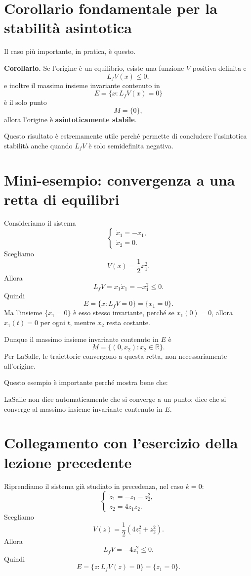 \section{Corollario fondamentale per la stabilità asintotica}

Il caso più importante, in pratica, è questo.

\medskip

\noindent
\textbf{Corollario.}
Se l'origine è un equilibrio, esiste una funzione \(V\) positiva definita e
\[
L_fV(x)\le 0,
\]
e inoltre il massimo insieme invariante contenuto in
\[
E=\{x:L_fV(x)=0\}
\]
è il solo punto
\[
M=\{0\},
\]
allora l'origine è \textbf{asintoticamente stabile}.

\medskip

\noindent
Questo risultato è estremamente utile perché permette di concludere l'asintotica stabilità anche quando \(L_fV\) è solo semidefinita negativa.

\section{Mini-esempio: convergenza a una retta di equilibri}

Consideriamo il sistema
\[
\begin{cases}
\dot x_1 = -x_1,\\[4pt]
\dot x_2 = 0.
\end{cases}
\]
Scegliamo
\[
V(x)=\frac{1}{2}x_1^2.
\]
Allora
\[
L_fV=x_1\dot x_1=-x_1^2\le 0.
\]
Quindi
\[
E=\{x:L_fV=0\}=\{x_1=0\}.
\]
Ma l'insieme \(\{x_1=0\}\) è esso stesso invariante, perché se \(x_1(0)=0\), allora \(x_1(t)=0\) per ogni \(t\), mentre \(x_2\) resta costante.

Dunque il massimo insieme invariante contenuto in \(E\) è
\[
M=\{(0,x_2):x_2\in\mathbb{R}\}.
\]
Per LaSalle, le traiettorie convergono a questa retta, non necessariamente all'origine.

Questo esempio è importante perché mostra bene che:
\begin{center}
LaSalle non dice automaticamente che si converge a un punto; dice che si converge al massimo insieme invariante contenuto in \(E\).
\end{center}

\section{Collegamento con l'esercizio della lezione precedente}

Riprendiamo il sistema già studiato in precedenza, nel caso \(k=0\):
\[
\begin{cases}
\dot z_1 = -z_1-z_2^2,\\[4pt]
\dot z_2 = 4z_1z_2.
\end{cases}
\]
Scegliamo
\[
V(z)=\frac{1}{2}\left(4z_1^2+z_2^2\right).
\]
Allora
\[
L_fV = -4z_1^2\le 0.
\]
Quindi
\[
E=\{z:L_fV(z)=0\}=\{z_1=0\}.
\]

